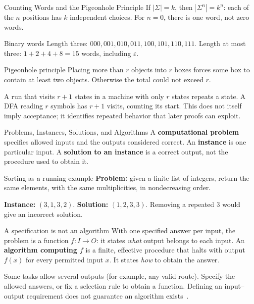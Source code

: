 \documentclass[10pt]{beamer}
\begin{document}
\begin{frame}{Counting Words and the Pigeonhole Principle}
  \small
  If $|\Sigma|=k$, then $|\Sigma^n|=k^n$: each of the $n$ positions has
  $k$ independent choices. For $n=0$, there is one word, not zero words.
  \begin{exampleblock}{Binary words}
    Length three: $000,001,010,011,100,101,110,111$.
    Length at most three: $1+2+4+8=15$ words, including $\varepsilon$.
  \end{exampleblock}
  \pause
  \begin{block}{Pigeonhole principle}
    Placing more than $r$ objects into $r$ boxes forces some box to contain
    at least two objects. Otherwise the total could not exceed $r$.
  \end{block}
  \pause
  A run that visits $r+1$ states in a machine with only $r$ states repeats
  a state. A DFA reading $r$ symbols has $r+1$ visits, counting its start.
  This does not itself imply acceptance; it identifies repeated behavior
  that later proofs can exploit.
\end{frame}

\begin{frame}{Problems, Instances, Solutions, and Algorithms}
  \small
  A \textbf{computational problem} specifies allowed inputs and the outputs
  considered correct. An \textbf{instance} is one particular input.
  A \textbf{solution to an instance} is a correct output, not the procedure
  used to obtain it.
  \begin{exampleblock}{Sorting as a running example}
    \textbf{Problem:} given a finite list of integers, return the same
    elements, with the same multiplicities, in nondecreasing order.
    \par\smallskip
    \textbf{Instance:} $(3,1,3,2)$.
    \quad\textbf{Solution:} $(1,2,3,3)$.
    Removing a repeated $3$ would give an incorrect solution.
  \end{exampleblock}
  \pause
  \begin{block}{A specification is not an algorithm}
    With one specified answer per input, the problem is a function
    $f:I\to O$: it states \emph{what} output belongs to each input.
    An \textbf{algorithm computing $f$} is a finite, effective procedure
    that halts with output $f(x)$ for every permitted input $x$.
    It states \emph{how} to obtain the answer.
  \end{block}
  Some tasks allow several outputs (for example, any valid route).
  Specify the allowed answers, or fix a selection rule to obtain a function.
  Defining an input--output requirement does not guarantee an algorithm
  exists~\cite{algorithms-intro}.
\end{frame}
\end{document}
